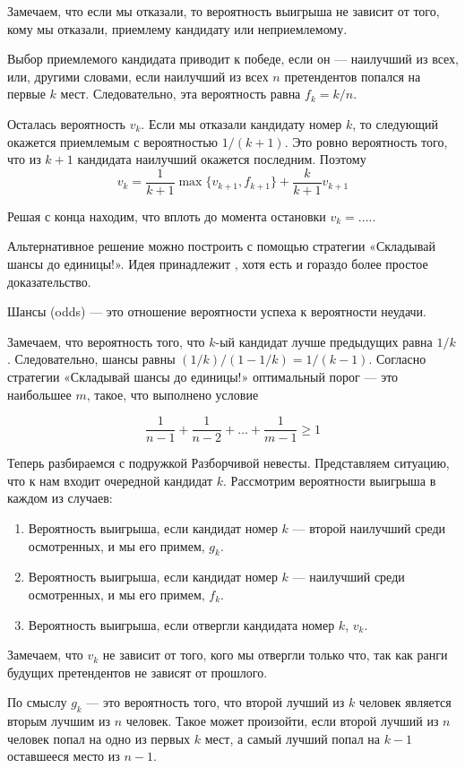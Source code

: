 \documentclass[a4paper]{caesar_book}
\theoremstyle{definition}
\newcounter{problem}
\newenvironment{problem}%
{%
\refstepcounter{problem}%
     \hypertarget{problem:{\theproblem}}{}
     \Writetofile{solution_file}{\protect\hypertarget{soln:\theproblem}{}}
     \begin{myenum}[label=\bfseries\protect\hyperlink{soln:\theproblem}{\theproblem}, ref=\theproblem, leftmargin=0pt]
     \item%
    }%
    {%
    \end{myenum}}
\begin{document}
\begin{problem}
\begin{sol}
Замечаем, что если мы отказали, то вероятность выигрыша не зависит от того,
кому мы отказали, приемлему кандидату или неприемлемому.


Выбор приемлемого кандидата приводит к победе, если он — наилучший из всех, или,
другими словами, если наилучший из всех $n$ претендентов попался на первые $k$ мест.
Следовательно, эта вероятность равна $f_k = k/n$.

Осталась вероятность $v_k$. Если мы отказали кандидату номер $k$, то следующий
окажется приемлемым с вероятностью $1/(k+1)$. Это ровно вероятность того, что
из $k+1$ кандидата наилучший окажется последним. Поэтому
\[
v_k = \frac{1}{k+1} \max \{v_{k+1}, f_{k+1} \} + \frac{k}{k+1} v_{k+1}
\]

Решая с конца находим, что вплоть до момента остановки $v_k = ....$.


Альтернативное решение можно построить с помощью стратегии
«Складывай шансы до единицы!».
Идея принадлежит \cite{bruss2000sum}, хотя есть и гораздо более простое доказательство.

Шансы (odds) — это отношение вероятности успеха к вероятности неудачи.

Замечаем, что вероятность того, что $k$-ый кандидат лучше предыдущих равна $1/k$.
Следовательно, шансы равны $(1/k)/(1-1/k)=1/(k-1)$.
Согласно стратегии «Складывай шансы до единицы!»
оптимальный порог — это наибольшее $m$, такое, что выполнено условие

\[
\frac{1}{n-1} + \frac{1}{n-2} + \ldots + \frac{1}{m-1} \geq 1
\]


Теперь разбираемся с подружкой Разборчивой невесты. Представляем ситуацию, что к нам
входит очередной кандидат $k$. Рассмотрим вероятности выигрыша в каждом
из случаев:

\begin{enumerate}
  \item Вероятность выигрыша,
  если кандидат номер $k$ — второй наилучший среди осмотренных, и мы его примем, $g_k$.
  \item Вероятность выигрыша,
  если кандидат номер $k$ — наилучший среди осмотренных, и мы его примем, $f_k$.
  \item Вероятность выигрыша, если отвергли кандидата номер $k$, $v_k$.
\end{enumerate}

Замечаем, что $v_k$ не зависит от того, кого мы отвергли только что, так как ранги
будущих претендентов не зависят от прошлого.

По смыслу $g_k$ — это вероятность того, что второй лучший из $k$ человек является вторым
лучшим из $n$ человек. Такое может произойти, если второй лучший из $n$ человек попал
на одно из первых $k$ мест, а самый лучший попал на $k-1$ оставшееся место из $n-1$.


\end{sol}
\end{problem}
\end{document}
